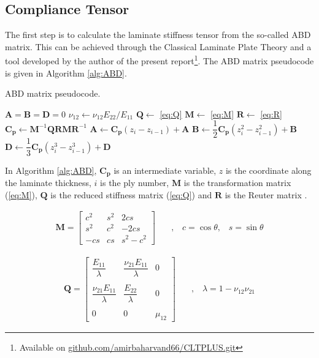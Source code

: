 \documentclass{article}
\begin{document}
\subsection{Compliance Tensor}
The first step is to calculate the laminate stiffness tensor from the so-called ABD matrix. This can be achieved through the Classical Laminate Plate Theory and a tool developed by the author of the present report\footnote{Available on \url{github.com/amirbaharvand66/CLTPLUS.git}}. The ABD matrix pseudocode is given in Algorithm \ref{alg:ABD}. \\

\begin{algorithm}[H]
\caption{ABD matrix pseudocode.}
\begin{algorithmic} 
\ENSURE $\bm{A} = \bm{B} = \bm{D} = 0$
\STATE $\nu_{12} \leftarrow \nu_{12}E_{22} / E_{11}$
\STATE $\bm{Q} \leftarrow$ \cref{eq:Q}
    \STATE $\bm{M} \leftarrow$ \cref{eq:M}
    \STATE $\bm{R} \leftarrow$ \cref{eq:R}
    \STATE $\bm{C_p} \leftarrow \bm{M}^{-1} \bm{Q} \bm{R} \bm{M} \bm{R}^{-1}$
    \STATE $\bm{A} \leftarrow \bm{C_p} (z_i - z_{i-1}) + \bm{A}$
    \STATE $\bm{B} \leftarrow \dfrac{1}{2} \bm{C_p} (z_i^2 - z_{i-1}^2) + \bm{B}$
    \STATE $\bm{D} \leftarrow \dfrac{1}{3} \bm{C_p} (z_i^3 - z_{i-1}^3) + \bm{D}$
\ENDFOR
\end{algorithmic}
\label{alg:ABD}
\end{algorithm}

In Algorithm \ref{alg:ABD}, $\bm{C_p}$ is an intermediate variable, $z$ is the coordinate along the laminate thickness, $i$ is the ply number, $\bm{M}$ is the transformation matrix (\cref{eq:M}), $\bm{Q}$ is the reduced stiffness matrix (\cref{eq:Q}) and $\bm{R}$ is the Reuter matrix \cite{Kaw2006}.

\begin{equation}
    \begin{matrix}
    \bm{M} = \begin{bmatrix}
        c^2 & s^2 & 2cs \\ 
        s^2 & c^2 & -2cs\\
        -cs & cs & s^2 - c^2
        \end{bmatrix} &
    \quad \text{,} \quad 
    c = \cos\theta \text{,} \quad s = \sin\theta
    \label{eq:M}
    \end{matrix}
\end{equation}

\begin{equation}
    \begin{matrix}
    \bm{Q} = \begin{bmatrix}
        \dfrac{E_{11}}{\lambda} & \dfrac{\nu_{21}E_{11}}{\lambda} & 0 \\ \\
        \dfrac{\nu_{21}E_{11}}{\lambda} & \dfrac{E_{22}}{\lambda} & 0\\ \\
        0 & 0 & \mu_{12}
        \end{bmatrix} &
    \quad \text{,} \quad 
    \lambda = 1 - \nu_{12}\nu_{21}
    \label{eq:Q}
    \end{matrix}
\end{equation}
\end{document}
